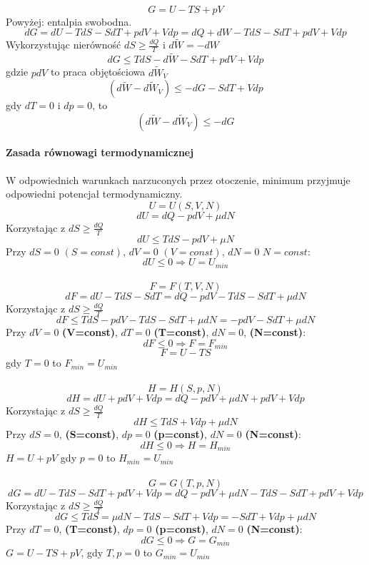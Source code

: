 \documentclass{article}
\begin{document}
		\paragraph{}
		$$G = U - TS + pV$$
		Powyżej: entalpia swobodna.
		$$dG = dU - TdS - SdT + pdV + Vdp = dQ + dW - TdS - SdT + pdV + Vdp$$
		Wykorzystując nierówność $dS \geqslant \frac{dQ}{T}$ i $d\widetilde{W} = -dW$
		$$dG \leqslant TdS - d\widetilde{W} - SdT + pdV + Vdp$$
		gdzie $pdV$ to praca objętościowa $d\widetilde{W}_V$
		$$(d\widetilde{W} - d\widetilde{W}_V) \leqslant -dG - SdT + Vdp$$
		gdy $dT=0$ i $dp=0$, to $$(d\widetilde{W} - d\widetilde{W}_V) \leqslant - dG$$
		\paragraph{Zasada równowagi termodynamicznej} W odpowiednich warunkach narzuconych przez otoczenie, minimum przyjmuje odpowiedni potencjał termodynamiczny.
		$$U = U(S,V,N)$$
		$$dU = dQ - pdV + \mu dN$$
		Korzystając z $dS \geqslant \frac{dQ}{T}$ 
		$$dU \leqslant TdS - pdV + \mu N$$
		Przy $dS=0$ $(S=const)$, $dV = 0$ $(V=const)$, $dN=0$ $N=const$:
		$$dU \leqslant 0 \Rightarrow U = U_{min}$$
		\paragraph{}
		$$F = F(T,V,N)$$
		$$dF = dU - TdS - SdT = dQ - pdV - TdS - SdT + \mu dN$$
		Korzystając z $dS \geqslant \frac{dQ}{T}$ 
		$$dF \leqslant TdS - pdV - TdS - SdT + \mu dN = -pdV - SdT + \mu dN$$
		Przy $dV=0$ \textbf{(V=const)}, $dT=0$ \textbf{(T=const)}, $dN=0$, \textbf{(N=const)}:
		$$dF \leqslant 0 \Rightarrow F = F_{min}$$
		$$F = U - TS$$
		gdy $T = 0$ to $F_{min} = U_{min}$
		\paragraph{}
		$$H = H(S,p,N)$$
		$$dH = dU + pdV + Vdp = dQ - pdV + \mu dN + pdV + Vdp$$
		Korzystając z $dS \geqslant \frac{dQ}{T}$ 
		$$dH \leqslant TdS + Vdp + \mu dN$$
		Przy $dS=0$, \textbf{(S=const)}, $dp=0$ \textbf{(p=const)}, $dN=0$ \textbf{(N=const)}:
		$$dH \leqslant 0 \Rightarrow H=H_{min}$$
		$H = U + pV$ gdy $p=0$ to $H_{min} = U_{min}$
		\paragraph{}
		$$G = G(T,p,N)$$
		$$dG = dU - TdS - SdT + pdV + Vdp = dQ - pdV + \mu dN - TdS - SdT + pdV + Vdp$$
		Korzystając z $dS \geqslant \frac{dQ}{T}$ 
		$$dG \leqslant TdS = \mu dN - TdS - SdT + Vdp = -SdT + Vdp + \mu dN$$
		Przy $dT=0$, \textbf{(T=const)}, $dp=0$ \textbf{(p=const)}, $dN=0$ \textbf{(N=const)}:
		$$dG \leqslant 0 \Rightarrow G = G_{min}$$
		$G = U - TS + pV$, gdy $T,p = 0$ to $G_{min} = U_{min}$
\end{document}
